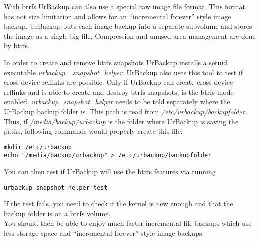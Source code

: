\documentclass[a4paper,10pt]{article}
\begin{document}
With btrfs UrBackup can also use a special raw image file format. This format has
not size limitation and allows for an ``incremental forever'' style image backup.
UrBackup puts each image backup into a separate subvolume and stores the image
as a single big file. Compression and unused area management are done by btrfs.

\noindent In order to create and remove btrfs snapshots UrBackup installs a setuid
executable \textsl{urbackup\_ snapshot\_helper}. UrBackup also uses this tool to
test if cross-device reflinks are possible. Only if UrBackup can create
cross-device reflinks and is able to create and destroy btrfs snapshots, is the
btrfs mode enabled. \textsl{urbackup\_snapshot\_helper} needs to be told separately
where the UrBackup backup folder is. This path is read from \textsl{/etc/urbackup/backupfolder}.
Thus, if \textsl{/media/backup/urbackup} is the folder where UrBackup is saving
the paths, following commands would properly create this file:
\begin{verbatim}
mkdir /etc/urbackup
echo "/media/backup/urbackup" > /etc/urbackup/backupfolder
\end{verbatim}
You can then test if UrBackup will use the btrfs features via running
\begin{verbatim}
urbackup_snapshot_helper test
\end{verbatim}
If the test fails, you need to check if the kernel is new enough and
that the backup folder is on a btrfs volume.\\

\noindent You should then be able to enjoy much faster incremental file backups which use less storage space
and ``incremental forever'' style image backups.
\end{document}
